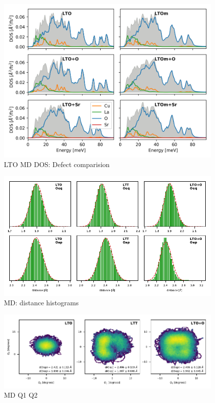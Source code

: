 \begin{figure}[]
	\centering
	\includegraphics[width=\textwidth]{fig/md/lto_defect_comparison.png}
	\caption[LTO MD DOS: Defect comparision]{LTO MD DOS: Defect comparision}
	\label{fig:lto_md_defect_comparison}
\end{figure}

\begin{figure}
	\centering
	\includegraphics[width=\textwidth]{fig/md/dist_hist.pdf}
	\caption[MD: distance histograms]{MD: distance histograms}
	\label{fig:md_distances}
\end{figure}

\begin{figure}
	\centering
	\includegraphics[width=\textwidth]{fig/md/prm_q1q2.pdf}
	\caption[MD Q1 Q2]{MD Q1 Q2}
	\label{fig:md_q1_q2}
\end{figure}

